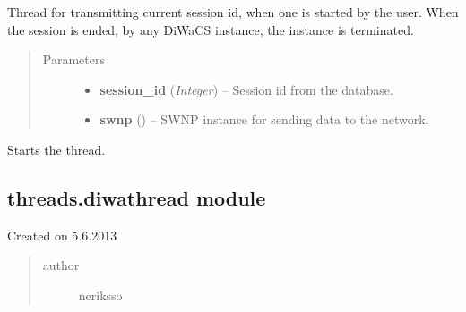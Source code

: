 \documentclass[letterpaper,10pt,english]{sphinxmanual}
\begin{document}
\begin{fulllineitems}
\label{threads:threads.current.CURRENT_SESSION}
Thread for transmitting current session id, when one is started by
the user.  When the session is ended, by any DiWaCS instance, the
instance is terminated.
\begin{quote}\begin{description}
\item[{Parameters}] \leavevmode\begin{itemize}
\item {} 
\textbf{session\_id} (\emph{Integer}) -- Session id from the database.

\item {} 
\textbf{swnp} ({\hyperref[swnp:swnp.SWNP]{}}) -- SWNP instance for sending data to the network.

\end{itemize}

\end{description}\end{quote}

\begin{fulllineitems}
\label{threads:threads.current.CURRENT_SESSION.run}
Starts the thread.

\end{fulllineitems}


\end{fulllineitems}



\subsection{threads.diwathread module}
\label{threads:module-threads.diwathread}\label{threads:threads-diwathread-module}
Created on 5.6.2013
\begin{quote}\begin{description}
\item[{author}] \leavevmode
neriksso

\end{description}\end{quote}
\end{document}

